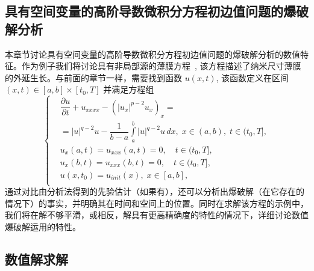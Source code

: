 \documentclass[twoside]{book}
\begin{document}
\begin{CJK*}{GBK}{song}

\newpage
\chapter{具有空间变量的高阶导数微积分方程初边值问题的爆破解分析}\label{Chapter_4}


本章节讨论具有空间变量的高阶导数微积分方程初边值问题的爆破解分析的数值特征。作为例子我们将讨论具有非局部源的薄膜方程~\cite{Sun&Liu&Wu}, 该方程描述了纳米尺寸薄膜的外延生长。与前面的章节一样，需要找到函数  $u(x,t)$, 该函数定义在区间 $(x,t) \in [a,b] \times [t_0,T]$
并满足方程组
\begin{equation}
\label{Ch4_main_equation}
\left\{
\begin{aligned}
&\dfrac{\partial u}{\partial t} + u_{xxxx} - (|u_x|^{p - 2} u_x)_x = \\
&= |u|^{q - 2} u - \dfrac{1}{b - a} \int\limits_a^b |u|^{q - 2} u \, dx, \; x \in (a,b), \; t \in (t_0,T], \\
&u_{x}(a,t) = u_{xxx}(a,t) = 0, \quad t \in (t_0,T], \\
&u_{x}(b,t) = u_{xxx}(b,t) = 0, \quad t \in (t_0,T], \\
&u(x,t_0) = u_{init}(x), \; x \in [a,b],\\
\end{aligned}
\right.
\end{equation}
通过对比由分析法得到的先验估计（如果有），还可以分析出爆破解（在它存在的情况下）的事实，并明确其在时间和空间上的位置。同时在求解该方程的示例中，我们将在解不够平滑，或相反，解具有更高精确度的特性的情况下，详细讨论数值爆破解运用的特性。


\section{数值解求解} \label{Ch_3_Numerical_solving}



\end{CJK*}
\end{document}
